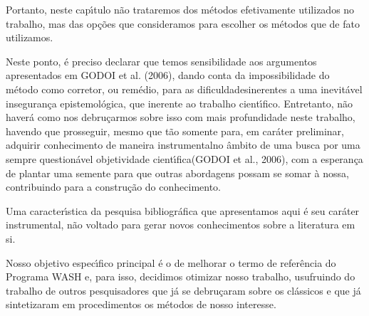 \documentclass[
12pt,		%
openright,	%
twoside,  %
a4paper,			%
chapter=TITLE,		%
english,			%
french,				%
spanish,			%
brazil				%
]{USPSC-classe/USPSC}
\begin{document}
Portanto, neste cap\'{\i}tulo n\~ao trataremos dos m\'etodos efetivamente utilizados no trabalho, mas das op\c{c}\~oes que consideramos para escolher os m\'etodos que de fato utilizamos.

















Neste ponto, \'e preciso declarar que temos sensibilidade aos argumentos apresentados em  GODOI et al. (2006), dando conta da impossibilidade \textquotedbl do m\'etodo como corretor, ou rem\'edio, para as dificuldades\textquotedbl  inerentes a uma inevit\'avel \textquotedbl inseguran\c{c}a epistemol\'ogica\textquotedbl , que inerente ao trabalho cient\'{\i}fico. Entretanto, n\~ao haver\'a como nos debru\c{c}armos sobre isso com mais profundidade neste trabalho, havendo que prosseguir, mesmo que t\~ao somente para, em car\'ater preliminar, \textquotedbl adquirir conhecimento de maneira instrumental\textquotedbl  no \^ambito de uma busca por uma sempre question\'avel \textquotedbl objetividade cient\'{\i}fica\textquotedbl  (GODOI et al., 2006), com a esperan\c{c}a de plantar uma semente para que outras abordagens possam se somar \`a nossa, contribuindo para a constru\c{c}\~ao do conhecimento.

















Uma caracter\'{\i}stica da pesquisa bibliogr\'afica que apresentamos aqui \'e seu  car\'ater instrumental, n\~ao voltado para gerar novos conhecimentos sobre a literatura em si.

















Nosso objetivo espec\'{\i}fico principal \'e o de melhorar o termo de refer\^encia do Programa WASH e, para isso, decidimos otimizar nosso trabalho, usufruindo do trabalho de outros pesquisadores que j\'a se debru\c{c}aram sobre os cl\'assicos e que j\'a sintetizaram em procedimentos os m\'etodos de nosso interesse.
\end{document}
